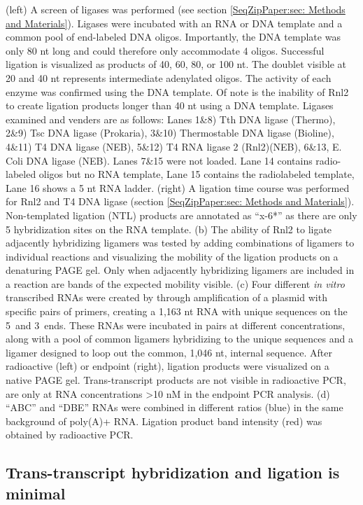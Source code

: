 			(left) A screen of ligases was performed (see section \ref{SeqZipPaper:sec: Methods and Materials}). Ligases were incubated with an RNA or DNA template and a common pool of end-labeled DNA oligos. Importantly, the DNA template was only 80 nt long and could therefore only accommodate 4 oligos. Successful ligation is visualized as products of 40, 60, 80, or 100 nt. The doublet visible at 20 and 40 nt represents intermediate adenylated oligos. The activity of each enzyme was confirmed using the DNA template. Of note is the inability of Rnl2 to create ligation products longer than 40 nt using a DNA template. Ligases examined and venders are as follows: Lanes 1\&8) Tth DNA ligase (Thermo), 2\&9) Tsc DNA ligase (Prokaria), 3\&10) Thermostable DNA ligase (Bioline), 4\&11) T4 DNA ligase (NEB), 5\&12) T4 RNA ligase 2 (Rnl2)(NEB), 6\&13, E. Coli DNA ligase (NEB). Lanes 7\&15 were not loaded. Lane 14 contains radio-labeled oligos but no RNA template, Lane 15 contains the radiolabeled template, Lane 16 shows a 5 nt RNA ladder.
			(right) A ligation time course was performed for Rnl2 and T4 DNA ligase (section \ref{SeqZipPaper:sec: Methods and Materials}). Non-templated ligation (NTL) products are annotated as ``x-6*'' as there are only 5 hybridization sites on the RNA template.
			(b) The ability of Rnl2 to ligate adjacently hybridizing ligamers was tested by adding combinations of ligamers to individual reactions and visualizing the mobility of the ligation products on a denaturing PAGE gel. Only when adjacently hybridizing ligamers are included in a reaction are bands of the expected mobility visible. 
			(c) Four different \textit{in vitro} transcribed RNAs were created by through amplification of a plasmid with specific pairs of primers, creating a 1,163 nt RNA with unique sequences on the 5\textprime~and 3\textprime~ends. These RNAs were incubated in pairs at different concentrations, along with a pool of common ligamers hybridizing to the unique sequences and a ligamer designed to loop out the common, 1,046 nt, internal sequence. After radioactive (left) or endpoint (right), ligation products were visualized on a native PAGE gel. Trans-transcript products are not visible in radioactive PCR, are only at RNA concentrations >10 nM in the endpoint PCR analysis.
			(d) ``ABC'' and ``DBE'' RNAs were combined in different ratios (blue) in the same background of poly(A)+ RNA. Ligation product band intensity (red) was obtained by radioactive PCR.

	\subsection{Trans-transcript hybridization and ligation is minimal}
		\label{SeqZipPaper:subsec: Trans-transcript hyb and ligation}

